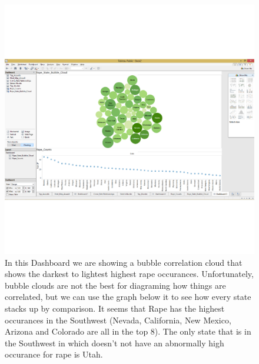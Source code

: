 \documentclass{article}\usepackage[]{graphicx}\usepackage[]{color}
\makeatletter
\def\maxwidth{ %
  \ifdim\Gin@nat@width>\linewidth
    \linewidth
  \else
    \Gin@nat@width
  \fi
}
\newenvironment{knitrout}{}{} %
\makeatother
\begin{document}
\begin{knitrout}
\color{fgcolor}\begin{figure}[]

\includegraphics[width=\maxwidth]{figure/unnamed-chunk-2-1} \caption[In this Dashboard we are showing a bubble correlation cloud that shows the darkest to lightest highest rape occurances]{In this Dashboard we are showing a bubble correlation cloud that shows the darkest to lightest highest rape occurances. Unfortunately, bubble clouds are not the best for diagraming how things are correlated, but we can use the graph below it to see how every state stacks up by comparison. It seems that Rape has the highest occurances in the Southwest (Nevada, California, New Mexico, Arizona and Colorado are all in the top 8). The only state that is in the Southwest in which doesn't not have an abnormally high occurance for rape is Utah.\label{fig:unnamed-chunk-2}}
\end{figure}


\end{knitrout}
\end{document}
